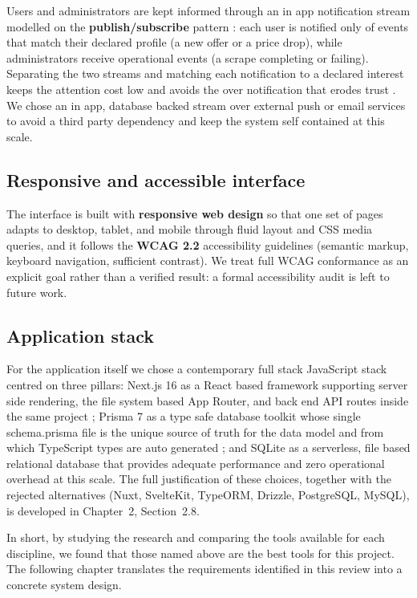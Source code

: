 Users and administrators are kept informed through an in app notification stream modelled on the \textbf{publish/subscribe} pattern \parencite{Eugster2003PubSub}: each user is notified only of events that match their declared profile (a new offer or a price drop), while administrators receive operational events (a scrape completing or failing). Separating the two streams and matching each notification to a declared interest keeps the attention cost low and avoids the over notification that erodes trust \parencite{McCrickardChewar2003}. We chose an in app, database backed stream over external push or email services to avoid a third party dependency and keep the system self contained at this scale.

\subsection{Responsive and accessible interface}

The interface is built with \textbf{responsive web design} \parencite{Marcotte2011} so that one set of pages adapts to desktop, tablet, and mobile through fluid layout and CSS media queries, and it follows the \textbf{WCAG 2.2} accessibility guidelines \parencite{WCAG22} (semantic markup, keyboard navigation, sufficient contrast). We treat full WCAG conformance as an explicit goal rather than a verified result: a formal accessibility audit is left to future work.

\subsection{Application stack}

For the application itself we chose a contemporary full stack JavaScript stack centred on three pillars: Next.js 16 as a React based framework supporting server side rendering, the file system based App Router, and back end API routes inside the same project \parencite{NextJSDocs2024}; Prisma 7 as a type safe database toolkit whose single schema.prisma file is the unique source of truth for the data model and from which TypeScript types are auto generated \parencite{PrismaDocs2024}; and SQLite as a serverless, file based relational database that provides adequate performance and zero operational overhead at this scale. The full justification of these choices, together with the rejected alternatives (Nuxt, SvelteKit, TypeORM, Drizzle, PostgreSQL, MySQL), is developed in Chapter~2, Section~2.8.

In short, by studying the research and comparing the tools available for each discipline, we found that those named above are the best tools for this project. The following chapter translates the requirements identified in this review into a concrete system design.

